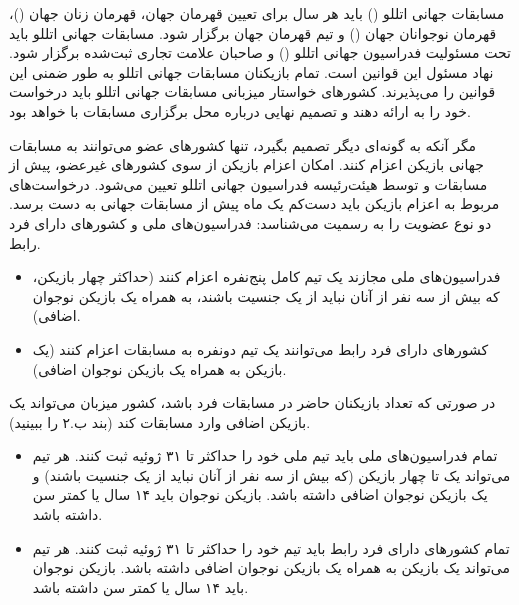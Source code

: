 


مسابقات جهانی اتللو () باید هر سال برای تعیین قهرمان جهان، قهرمان زنان جهان ()، قهرمان نوجوانان جهان () و تیم قهرمان جهان برگزار شود. مسابقات جهانی اتللو باید تحت مسئولیت فدراسیون جهانی اتللو () و صاحبان علامت تجاری ثبت‌شده  برگزار شود.  نهاد مسئول این قوانین است. تمام بازیکنان مسابقات جهانی اتللو به طور ضمنی این قوانین را می‌پذیرند. کشورهای خواستار میزبانی مسابقات جهانی اتللو باید درخواست خود را به  ارائه دهند و تصمیم نهایی درباره محل برگزاری مسابقات با  خواهد بود.



مگر آنکه  به گونه‌ای دیگر تصمیم بگیرد، تنها کشورهای عضو  می‌توانند به مسابقات جهانی بازیکن اعزام کنند. امکان اعزام بازیکن از سوی کشورهای غیرعضو، پیش از مسابقات و توسط هیئت‌رئیسه فدراسیون جهانی اتللو تعیین می‌شود. درخواست‌های مربوط به اعزام بازیکن باید دست‌کم یک ماه پیش از مسابقات جهانی به دست  برسد.  دو نوع عضویت را به رسمیت می‌شناسد: فدراسیون‌های ملی و کشورهای دارای فرد رابط.

\begin{itemize}
  \item فدراسیون‌های ملی مجازند یک تیم کامل پنج‌نفره اعزام کنند (حداکثر چهار بازیکن، که بیش از سه نفر از آنان نباید از یک جنسیت باشند، به همراه یک بازیکن نوجوان اضافی).
  \item کشورهای دارای فرد رابط می‌توانند یک تیم دونفره به مسابقات اعزام کنند (یک بازیکن به همراه یک بازیکن نوجوان اضافی).
\end{itemize}

در صورتی که تعداد بازیکنان حاضر در مسابقات فرد باشد، کشور میزبان می‌تواند یک بازیکن اضافی وارد مسابقات کند (بند ب.۲ را ببینید).


\begin{itemize}
  \item تمام فدراسیون‌های ملی باید تیم ملی خود را حداکثر تا ۳۱ ژوئیه ثبت کنند. هر تیم می‌تواند یک تا چهار بازیکن (که بیش از سه نفر از آنان نباید از یک جنسیت باشند) و یک بازیکن نوجوان اضافی داشته باشد. بازیکن نوجوان باید ۱۴ سال یا کمتر سن داشته باشد.
  \item تمام کشورهای دارای فرد رابط باید تیم خود را حداکثر تا ۳۱ ژوئیه ثبت کنند. هر تیم می‌تواند یک بازیکن به همراه یک بازیکن نوجوان اضافی داشته باشد. بازیکن نوجوان باید ۱۴ سال یا کمتر سن داشته باشد.
\end{itemize}

